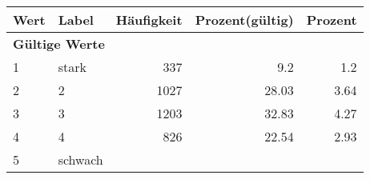      \begin{longtable}{lXrrr}
     \toprule
     \textbf{Wert} & \textbf{Label} & \textbf{Häufigkeit} & \textbf{Prozent(gültig)} & \textbf{Prozent} \\
     \endhead
     \midrule
     \multicolumn{5}{l}{\textbf{Gültige Werte}}\\

     1 &
     \multicolumn{1}{X}{ stark   } &


       \num{337} &
       \num[round-mode=places,round-precision=2]{9.2} &
         \num[round-mode=places,round-precision=2]{1.2} \\

     2 &
     \multicolumn{1}{X}{ 2   } &


       \num{1027} &
       \num[round-mode=places,round-precision=2]{28.03} &
         \num[round-mode=places,round-precision=2]{3.64} \\

     3 &
     \multicolumn{1}{X}{ 3   } &


       \num{1203} &
       \num[round-mode=places,round-precision=2]{32.83} &
         \num[round-mode=places,round-precision=2]{4.27} \\

     4 &
     \multicolumn{1}{X}{ 4   } &


       \num{826} &
       \num[round-mode=places,round-precision=2]{22.54} &
         \num[round-mode=places,round-precision=2]{2.93} \\

     5 &
     \multicolumn{1}{X}{ schwach   } &



\end{longtable}
